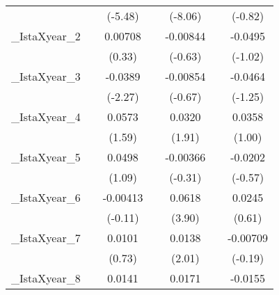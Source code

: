 {\begin{tabular}{l*{6}{c}}
            &                     &     (-5.48)         &                     &     (-8.06)         &                     &     (-0.82)         \\
[1em]
\_IstaXyear\_2&                     &     0.00708         &                     &    -0.00844         &                     &     -0.0495         \\
            &                     &      (0.33)         &                     &     (-0.63)         &                     &     (-1.02)         \\
[1em]
\_IstaXyear\_3&                     &     -0.0389\sym{*}  &                     &    -0.00854         &                     &     -0.0464         \\
            &                     &     (-2.27)         &                     &     (-0.67)         &                     &     (-1.25)         \\
[1em]
\_IstaXyear\_4&                     &      0.0573         &                     &      0.0320         &                     &      0.0358         \\
            &                     &      (1.59)         &                     &      (1.91)         &                     &      (1.00)         \\
[1em]
\_IstaXyear\_5&                     &      0.0498         &                     &    -0.00366         &                     &     -0.0202         \\
            &                     &      (1.09)         &                     &     (-0.31)         &                     &     (-0.57)         \\
[1em]
\_IstaXyear\_6&                     &    -0.00413         &                     &      0.0618\sym{***}&                     &      0.0245         \\
            &                     &     (-0.11)         &                     &      (3.90)         &                     &      (0.61)         \\
[1em]
\_IstaXyear\_7&                     &      0.0101         &                     &      0.0138         &                     &    -0.00709         \\
            &                     &      (0.73)         &                     &      (2.01)         &                     &     (-0.19)         \\
[1em]
\_IstaXyear\_8&                     &      0.0141         &                     &      0.0171         &                     &     -0.0155         \\

\end{tabular}}
